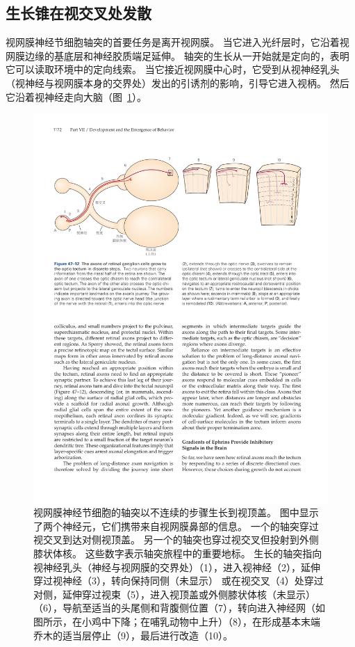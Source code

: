 \subsection{生长锥在视交叉处发散}

视网膜神经节细胞轴突的首要任务是离开视网膜。
当它进入光纤层时，它沿着视网膜边缘的基底层和神经胶质端足延伸。
轴突的生长从一开始就是定向的，表明它可以读取环境中的定向线索。
当它接近视网膜中心时，它受到从视神经乳头（视神经与视网膜本身的交界处）发出的引诱剂的影响，引导它进入视柄。
然后它沿着视神经走向大脑（图~\ref{fig:47_12}）。


\begin{figure}[htbp]
	\centering
	\includegraphics[width=1.0\linewidth]{chap47/fig_47_12}
	\caption{视网膜神经节细胞的轴突以不连续的步骤生长到视顶盖。
		图中显示了两个神经元，它们携带来自视网膜鼻部的信息。
		一个的轴突穿过视交叉到达对侧视顶盖。
		另一个的轴突也穿过视交叉但投射到外侧膝状体核。
		这些数字表示轴突旅程中的重要地标。
		生长的轴突指向视神经乳头（神经与视网膜的交界处）（1），进入视神经（2），延伸穿过视神经（3），转向保持同侧（未显示） 或在视交叉（4）处穿过对侧，延伸穿过视束（5），进入视顶盖或外侧膝状体核（未显示）（6），导航至适当的头尾侧和背腹侧位置（7），转向进入神经网（如图所示，在小鸡中下降；在哺乳动物中上升）（8），在形成基本末端乔木的适当层停止（9），最后进行改造（10）。}
	\label{fig:47_12}
\end{figure}


